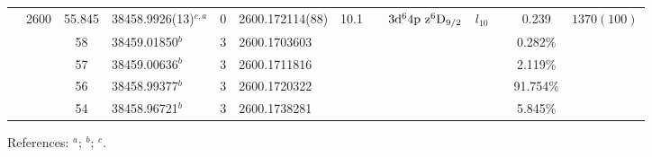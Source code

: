\begin{table*}
\begin{center}
{\begin{tabular}{:l;l;c;l;c;l;c;l;l;c;c;c;c}
                                  & 2600   & 55.845    & 38458.9926(13)$^{c,a}$           & 0 &   2600.172114(88)  & 10.1 & $                                        $ & $3\rm{d}^64\rm{p~z}^6\rm{D}_{9/2}        $ & $l_{10}$ &              & 0.239     & $ 1370(100)$\\
\rowstyle{\itshape}               &        & 58        & 38459.01850$^{b}$                & 3 &  2600.1703603      &      & $                                        $ & $                                        $ & $      $ &              & 0.282\%   & $          $\\
\rowstyle{\itshape}               &        & 57        & 38459.00636$^{b}$                & 3 &  2600.1711816      &      & $                                        $ & $                                        $ & $      $ &              & 2.119\%   & $          $\\
\rowstyle{\itshape}               &        & 56        & 38458.99377$^{b}$                & 3 &  2600.1720322      &      & $                                        $ & $                                        $ & $      $ &              & 91.754\%  & $          $\\
\rowstyle{\itshape}               &        & 54        & 38458.96721$^{b}$                & 3 &  2600.1738281      &      & $                                        $ & $                                        $ & $      $ &              & 5.845\%   & $          $\\
\hline
\end{tabular}
}
{\footnotesize References:
$^{a}$\citet{Nave:2012:1570};
$^{b}$\citet{Porsev:2009:032519};
$^{c}$\citet{Aldenius:2009:014008}.}
\end{center}
\end{table*}
